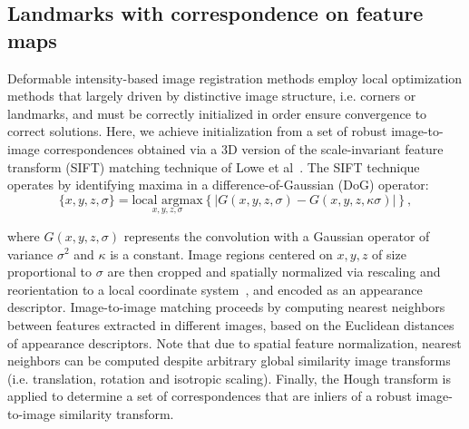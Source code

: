 \documentclass{llncs}
\begin{document}
\subsection{Landmarks with correspondence on feature maps}
\label{subsec:Correspondence}
Deformable intensity-based image registration methods employ local optimization methods that largely driven by distinctive image structure, i.e. corners or landmarks, and must be correctly initialized in order ensure convergence to correct solutions. Here, we achieve initialization from a set of robust image-to-image correspondences obtained via a 3D version of the scale-invariant feature transform (SIFT) matching technique of Lowe et al~\cite{Lowe:04}. The SIFT technique operates by identifying maxima in a difference-of-Gaussian (DoG) operator:
\begin{equation}
 \{x,y,z,\sigma\} = \underset{x,y,z,\sigma}{\mbox{local argmax}}\left\{|G(x,y,z,\sigma)-G(x,y,z,\kappa\sigma)|\right\},
\end{equation}

where $G(x,y,z,\sigma)$ represents the convolution with a Gaussian operator of variance $\sigma^2$ and $\kappa$ is a constant. Image regions centered on $x,y,z$ of size proportional to $\sigma$ are then cropped and spatially normalized via rescaling and reorientation to a local coordinate system~\cite{Allaire:08}, and encoded as an appearance descriptor. Image-to-image matching proceeds by computing nearest neighbors between features extracted in different images, based on the Euclidean distances of appearance descriptors. Note that due to spatial feature normalization, nearest neighbors can be computed despite arbitrary global similarity image transforms (i.e. translation, rotation and isotropic scaling). Finally, the Hough transform is applied to determine a set of correspondences that are inliers of a robust image-to-image similarity transform.
\end{document}
